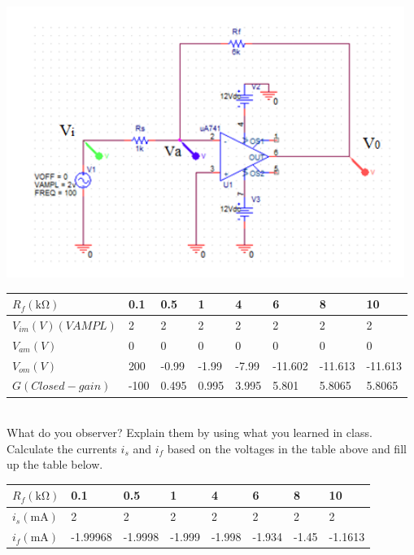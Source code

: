 \documentclass[a4paper]{article}
\begin{document}
\begin{itemize}
\begin{itemize}
	      	      \includegraphics{circuit-2.png} \\      
	      \end{itemize}
	      \begin{tabular}{|l|l|l|l|l|l|l|l|}
	      	\hline
	      	$R_{f}(\si{\kilo\ohm})$ & 0.1  & 0.5   & 1     & 4     & 6       & 8       & 10      \\
	      	\hline
	      	$V_{im}(V) (VAMPL)$     & 2    & 2     & 2     & 2     & 2       & 2       & 2       \\
	      	\hline
	      	$V_{am}(V)$             & 0    & 0     & 0     & 0     & 0       & 0       & 0       \\
	      	\hline
	      	$V_{om}(V)$             & 200  & -0.99 & -1.99 & -7.99 & -11.602 & -11.613 & -11.613 \\
	      	\hline
	      	$G(Closed-gain)$        & -100 & 0.495 & 0.995 & 3.995 & 5.801   & 5.8065  & 5.8065  \\
	      	\hline
	      \end{tabular} \\
	      What do you observer? Explain them by using what you learned in class. Calculate the currents $i_{s}$ and $i_{f}$ based on the voltages in the table above and fill up the table below. \\
	      \begin{tabular}{|l|l|l|l|l|l|l|l|}
	      	\hline
	      	$R_{f}(\si{\kilo\ohm})$     & 0.1      & 0.5     & 1      & 4      & 6      & 8     & 10      \\
	      	\hline
	      	$i_{s}(\si{\milli\ampere})$ & 2        & 2       & 2      & 2      & 2      & 2     & 2       \\
	      	\hline
	      	$i_{f}(\si{\milli\ampere})$ & -1.99968 & -1.9998 & -1.999 & -1.998 & -1.934 & -1.45 & -1.1613 \\

\end{tabular}
\end{itemize}
\end{document}
